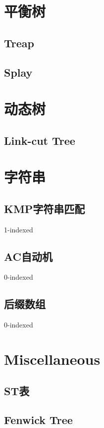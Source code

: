 \documentclass{article}
\begin{document}
	\section{平衡树}
		\subsection{Treap}
		\subsection{Splay}

	\newpage

	\section{动态树}
		\subsection{Link-cut Tree}

	\newpage

	\section{字符串}
		\subsection{KMP字符串匹配}
		1-indexed
		\subsection{AC自动机}
		0-indexed
		
		\subsection{后缀数组}
		0-indexed
		

	\newpage

	\section{Miscellaneous}
		\subsection{ST表}
		\subsection{Fenwick Tree}
\end{document}
